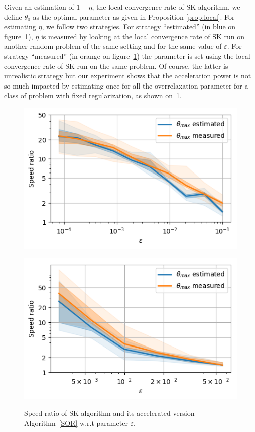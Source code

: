 \documentclass{article} %
\renewcommand{\epsilon}{\varepsilon}
\theoremstyle{plain}
\theoremstyle{definition}
\theoremstyle{remark}
\begin{document}
Given an estimation of $1-\eta$, the local convergence rate of SK algorithm, we define $\theta_0$ as the optimal parameter as given in Proposition \ref{prop:local}. For estimating $\eta$, we follow two strategies. For strategy ``estimated'' (in blue on figure~\ref{fig:comparison}), $\eta$ is measured by looking at the local convergence rate of SK run on another random problem of the same setting and for the same value of $\epsilon$. For strategy ``measured'' (in orange on figure~\ref{fig:comparison}) the parameter is set using the local convergence rate of SK run on the same problem. Of course, the latter is unrealistic strategy but our experiment shows that the acceleration power is not so much impacted by estimating once for all the overrelaxation parameter for a class of problem with fixed regularization, as shown on~\ref{fig:comparison}.
\begin{figure}
\begin{minipage}[b]{.5\linewidth}
   \centering
   \includegraphics[scale=0.6]{images/speedratio_image}
                    \label{fig:compare_a}
\end{minipage}%
			\begin{minipage}[b]{.5\linewidth}
                    \centering
			\includegraphics[scale=0.6]{images/speedratio_ML}
                    \label{fig:compare_b}
\end{minipage}
			\caption{\label{fig:comparison}Speed ratio of SK algorithm and its accelerated version Algorithm~\ref{SOR} w.r.t parameter $\epsilon$.}%
\end{figure}
\end{document}

